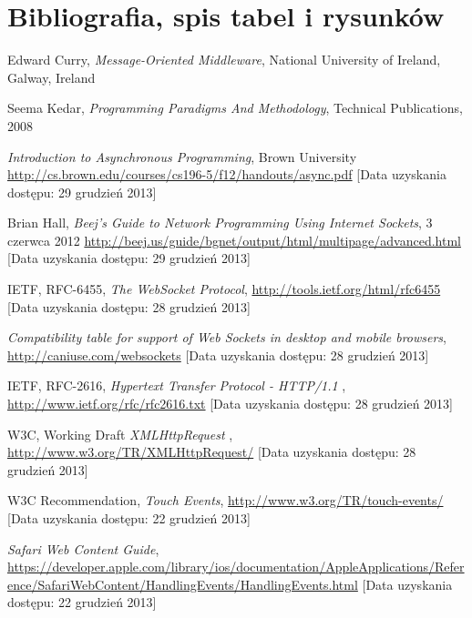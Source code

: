\section{Bibliografia, spis tabel i rysunków}

\begin{thebibliography}{1}
  
  
   Edward Curry, \emph{Message-Oriented Middleware}, National University of Ireland, Galway, Ireland

   Seema Kedar, \emph{Programming Paradigms And Methodology}, Technical Publications, 2008

   \emph{Introduction to Asynchronous Programming}, Brown University \url{http://cs.brown.edu/courses/cs196-5/f12/handouts/async.pdf} [Data uzyskania dostępu: 29 grudzień 2013]

   Brian Hall, \emph{Beej's Guide to Network Programming Using Internet Sockets}, 3 czerwca 2012 \url{http://beej.us/guide/bgnet/output/html/multipage/advanced.html} [Data uzyskania dostępu: 29 grudzień 2013]

   IETF, RFC-6455, \emph{The WebSocket Protocol}, \url{http://tools.ietf.org/html/rfc6455} [Data uzyskania dostępu: 28 grudzień 2013]

   \emph{Compatibility table for support of Web Sockets in desktop and mobile browsers}, \url{http://caniuse.com/websockets} [Data uzyskania dostępu: 28 grudzień 2013]

   IETF, RFC-2616, \emph{Hypertext Transfer Protocol - HTTP/1.1} , \url{http://www.ietf.org/rfc/rfc2616.txt} [Data uzyskania dostępu: 28 grudzień 2013]

   W3C, Working Draft \emph{XMLHttpRequest} , \url{http://www.w3.org/TR/XMLHttpRequest/} [Data uzyskania dostępu: 28 grudzień 2013]

   W3C Recommendation, {\em Touch Events}, \url{http://www.w3.org/TR/touch-events/} [Data uzyskania dostępu: 22 grudzień 2013]
  
   {\em Safari Web Content Guide}, \url{https://developer.apple.com/library/ios/documentation/AppleApplications/Reference/SafariWebContent/HandlingEvents/HandlingEvents.html} [Data uzyskania dostępu: 22 grudzień 2013]
  

\end{thebibliography}
